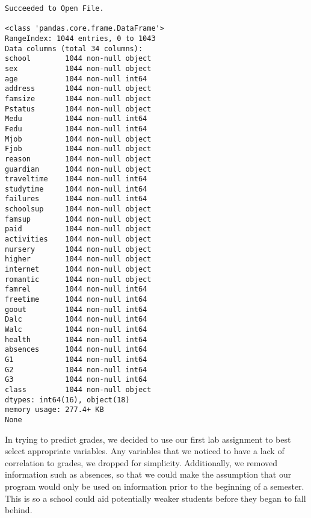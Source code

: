 \documentclass[11pt]{article}
\begin{document}
    \begin{Verbatim}[commandchars=\\\{\}]
Succeeded to Open File.

<class 'pandas.core.frame.DataFrame'>
RangeIndex: 1044 entries, 0 to 1043
Data columns (total 34 columns):
school        1044 non-null object
sex           1044 non-null object
age           1044 non-null int64
address       1044 non-null object
famsize       1044 non-null object
Pstatus       1044 non-null object
Medu          1044 non-null int64
Fedu          1044 non-null int64
Mjob          1044 non-null object
Fjob          1044 non-null object
reason        1044 non-null object
guardian      1044 non-null object
traveltime    1044 non-null int64
studytime     1044 non-null int64
failures      1044 non-null int64
schoolsup     1044 non-null object
famsup        1044 non-null object
paid          1044 non-null object
activities    1044 non-null object
nursery       1044 non-null object
higher        1044 non-null object
internet      1044 non-null object
romantic      1044 non-null object
famrel        1044 non-null int64
freetime      1044 non-null int64
goout         1044 non-null int64
Dalc          1044 non-null int64
Walc          1044 non-null int64
health        1044 non-null int64
absences      1044 non-null int64
G1            1044 non-null int64
G2            1044 non-null int64
G3            1044 non-null int64
class         1044 non-null object
dtypes: int64(16), object(18)
memory usage: 277.4+ KB
None

    \end{Verbatim}

    In trying to predict grades, we decided to use our first lab assignment
to best select appropriate variables. Any variables that we noticed to
have a lack of correlation to grades, we dropped for simplicity.
Additionally, we removed information such as absences, so that we could
make the assumption that our program would only be used on information
prior to the beginning of a semester. This is so a school could aid
potentially weaker students before they began to fall behind.
\end{document}
